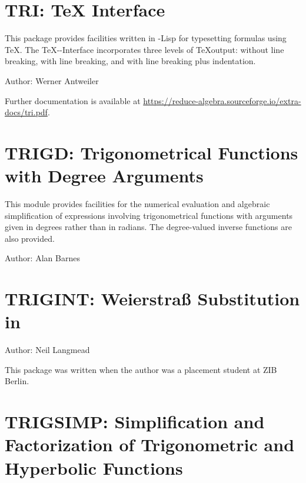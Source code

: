 \section{TRI: TeX \REDUCE Interface}

This package provides facilities written in \REDUCE-Lisp for typesetting
\REDUCE formulas using \TeX.  The \TeX-\REDUCE-Interface incorporates three
levels of \TeX output: without line breaking, with line breaking, and
with line breaking plus indentation.

Author: Werner Antweiler

\begin{sloppypar}
  Further documentation is available at
  \url{https://reduce-algebra.sourceforge.io/extra-docs/tri.pdf}.
\end{sloppypar}

\newpage

\section{TRIGD: Trigonometrical Functions with Degree Arguments}

This module provides facilities for the numerical evaluation and
algebraic simplification of expressions involving trigonometrical
functions with arguments given in degrees rather than in radians. The
degree-valued inverse functions are also provided.

Author: Alan Barnes



\newpage

\section{TRIGINT: Weierstra\ss{} Substitution in \REDUCE}

Author: Neil Langmead

This package was written when the author was a placement student at ZIB Berlin.



\iffalse
\newpage

\section{TRIGSIMP: Simplification and Factorization of Trigonometric
and Hyperbolic Functions}

